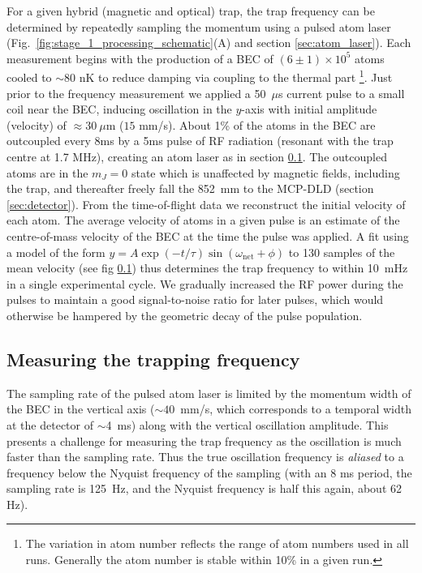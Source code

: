 	For a given hybrid (magnetic and optical) trap, the trap frequency can be determined by repeatedly sampling the momentum using a pulsed atom laser (Fig.~\ref{fig:stage_1_processing_schematic}(A) and section \ref{sec:atom_laser}). Each measurement begins with the production of a BEC of $(6\pm1)\times10^5$ \mhe atoms cooled to $\sim80$ nK to reduce damping via coupling to the thermal part \footnote{The variation in atom number reflects the range of atom numbers used in all runs. Generally the atom number is stable within 10\% in a given run.}.
	Just prior to the frequency measurement we applied a 50~$\mu$s current pulse to a small coil near the BEC,  inducing oscillation in the $y$-axis with initial amplitude (velocity) of $\approx30~\mu$m ($15$ mm/s).
	About 1\% of the atoms in the BEC are outcoupled every 8ms by a 5ms pulse of RF radiation (resonant with the trap centre at 1.7 MHz), creating an atom laser as in section \ref{}.
	The outcoupled atoms are in the $m_J=0$ state which is unaffected by magnetic fields, including the trap, and thereafter freely fall the 852~mm to the MCP-DLD (section \ref{sec:detector}).
	From the time-of-flight data we reconstruct the initial velocity of each atom. 
	The average velocity of atoms in a given pulse is an estimate of the centre-of-mass velocity of the BEC at the time the pulse was applied.
	A fit using a model of the form $y = A \exp(-t/\tau)\sin(\omega_\mathrm{net}+\phi)$ to 130 samples of the mean velocity (see fig \ref{}) thus determines the trap frequency to within 10~mHz in a single experimental cycle. 
	We gradually increased the RF power during the pulses to maintain a good signal-to-noise ratio for later pulses, which would otherwise be hampered by the geometric decay of the pulse population.


\subsection{Measuring the trapping frequency}

	
		
		
	The sampling rate of the pulsed atom laser is limited by the momentum width of the BEC in the vertical axis (\(\sim40\)~mm/s, which corresponds to a temporal width at the detector of \(\sim\)4~ms) along with the vertical oscillation amplitude. This presents a challenge for measuring the trap frequency as the oscillation is much faster than the sampling rate. 
	Thus the true oscillation frequency is \emph{aliased} to a frequency below the Nyquist frequency of the sampling (with an 8 ms period, the sampling rate is 125~Hz, and the Nyquist frequency is half this again, about 62 Hz).

